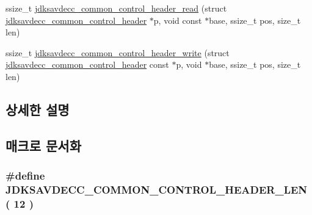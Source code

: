 \begin{DoxyCompactItemize}
\item 
ssize\+\_\+t \hyperlink{group__jdksavdecc__avtp__common__control__header_ga92a6293fe53957c3ea12564fff690d18}{jdksavdecc\+\_\+common\+\_\+control\+\_\+header\+\_\+read} (struct \hyperlink{structjdksavdecc__common__control__header}{jdksavdecc\+\_\+common\+\_\+control\+\_\+header} $\ast$p, void const $\ast$base, ssize\+\_\+t pos, size\+\_\+t len)
\item 
ssize\+\_\+t \hyperlink{group__jdksavdecc__avtp__common__control__header_ga5ee847b232024b2cf936899b912f0c96}{jdksavdecc\+\_\+common\+\_\+control\+\_\+header\+\_\+write} (struct \hyperlink{structjdksavdecc__common__control__header}{jdksavdecc\+\_\+common\+\_\+control\+\_\+header} const $\ast$p, void $\ast$base, ssize\+\_\+t pos, size\+\_\+t len)
\end{DoxyCompactItemize}


\subsection{상세한 설명}


\subsection{매크로 문서화}
\subsubsection[{\texorpdfstring{J\+D\+K\+S\+A\+V\+D\+E\+C\+C\+\_\+\+C\+O\+M\+M\+O\+N\+\_\+\+C\+O\+N\+T\+R\+O\+L\+\_\+\+H\+E\+A\+D\+E\+R\+\_\+\+L\+EN}{JDKSAVDECC_COMMON_CONTROL_HEADER_LEN}}]{\setlength{\rightskip}{0pt plus 5cm}\#define J\+D\+K\+S\+A\+V\+D\+E\+C\+C\+\_\+\+C\+O\+M\+M\+O\+N\+\_\+\+C\+O\+N\+T\+R\+O\+L\+\_\+\+H\+E\+A\+D\+E\+R\+\_\+\+L\+EN~( 12 )}\hypertarget{group__jdksavdecc__avtp__common__control__header_gaae84052886fb1bb42f3bc5f85b741dff}{}\label{group__jdksavdecc__avtp__common__control__header_gaae84052886fb1bb42f3bc5f85b741dff}


